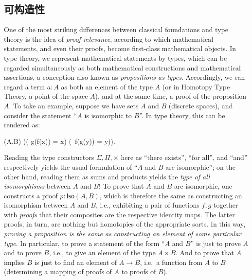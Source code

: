\subsection*{可构造性} 

%

One of the most striking differences between classical foundations and type theory is the idea of \emph{proof relevance}, according to which mathematical statements, and even their proofs, become first-class mathematical objects.
In type theory, we represent mathematical statements by types, which can be regarded simultaneously as both mathematical constructions and mathematical assertions, a conception also known as \emph{propositions as types}.
%
Accordingly, we can regard a term $a : A$ as both an element of the type $A$ (or in Homotopy Type Theory, a point of the space $A$), and at the same time, a proof of the proposition $A$.
To take an example, suppose we have sets $A$ and $B$ (discrete spaces),
%
and consider the statement ``$A$ is isomorphic to $B$''.
In type theory, this can be rendered as:
\begin{narrowmultline*}
  (A,B)  \narrowbreak
  \Big(\big( g(f(x)) = x\big) \times \big(\, f(g(y)) = y\big)\Big).
\end{narrowmultline*}
%
Reading the type constructors $\Sigma, \Pi, \times$  here  as ``there exists'', ``for all'', and ``and'' respectively yields the usual formulation of ``$A$ and $B$ are isomorphic''; on the other hand, reading them as sums and products yields the \emph{type of all isomorphisms} between $A$ and $B$!  To prove that $A$ and $B$ are isomorphic, one  constructs a proof $p : \mathsf{Iso}(A,B)$, which is therefore the same  as constructing an isomorphism between $A$ and $B$, i.e., exhibiting a pair of functions $f, g$ together with \emph{proofs} that their composites are the respective identity maps.  The latter proofs, in turn, are nothing but homotopies of the appropriate sorts.  In this way, \emph{proving a proposition is the same as constructing an element of some particular type.}
In particular, to prove a statement of the form ``$A$ and $B$'' is just to prove $A$ and to prove $B$, i.e., to give an element of the type $A\times B$.
And to prove that $A$ implies $B$ is just to find an element of $A\to B$, i.e.\ a function from $A$ to $B$ (determining a mapping of proofs of $A$ to proofs of $B$).

